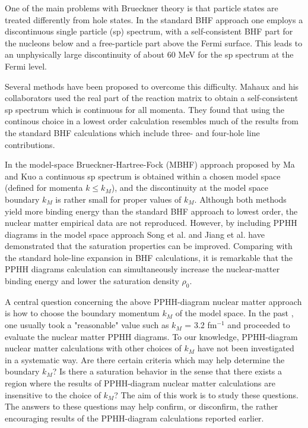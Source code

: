 One of the main problems with Brueckner theory is that particle states 
are treated differently from hole states.
In the standard BHF approach\cite{day67,day81} one employs a discontinuous 
single particle (sp) spectrum, with a 
self-consistent BHF part for the nucleons below  and a 
free-particle part above the Fermi surface. 
This leads to an unphysically large discontinuity 
of about 60 MeV for the sp spectrum at the Fermi level.

Several methods have been proposed to overcome this difficulty. 
Mahaux and his collaborators\cite{mahaux85} used  the real part of the 
reaction matrix
to obtain a self-consistent sp spectrum which is continuous for all 
momenta. They found that using the continous choice in a lowest order
calculation resembles much of the results from the standard BHF 
calculations which  include three- and four-hole line contributions.

In the model-space Brueckner-Hartree-Fock (MBHF) approach proposed by 
Ma and Kuo\cite{km83}
a continuous sp spectrum is obtained within a chosen model space
(defined for momenta $k\leq k_M$), and the discontinuity at the 
model space boundary  $k_M$ is 
rather small for proper values of $k_M$.
Although both methods yield more binding energy than 
the standard BHF approach to lowest order, the nuclear matter 
empirical data are not reproduced. 
However, 
by including PPHH diagrams in the model space approach 
Song et al. \cite{shk87} and Jiang et al.
\cite{jia88} have demonstrated that the saturation properties  
can be improved.   
Comparing with the standard hole-line expansion
in BHF  calculations, it is remarkable
that the PPHH diagrams calculation can simultaneously increase
the nuclear-matter binding energy and lower the
saturation density $\rho _0$. 

A central question concerning the above PPHH-diagram nuclear matter
approach is how to choose the boundary momentum  $k_M$
of the model space.
In the past \cite{shk87,jia88}, one usually took a "reasonable"
value such as $k_M$ = 3.2 fm$^{-1}$ 
and proceeded to evaluate the nuclear matter PPHH diagrams. 
To our knowledge, PPHH-diagram
nuclear matter calculations with other choices of $k_M$  have not been
investigated in a systematic way. Are there certain criteria which may
help determine the boundary $k_M$?
Is there a saturation behavior in the sense that
there exists a region where the results of PPHH-diagram nuclear
matter calculations are insensitive to the choice of $k_M$? 
The aim of this
work is to study these questions.
The answers to these questions may help  confirm, or disconfirm, the
rather encouraging results of the PPHH-diagram calculations reported 
earlier.


